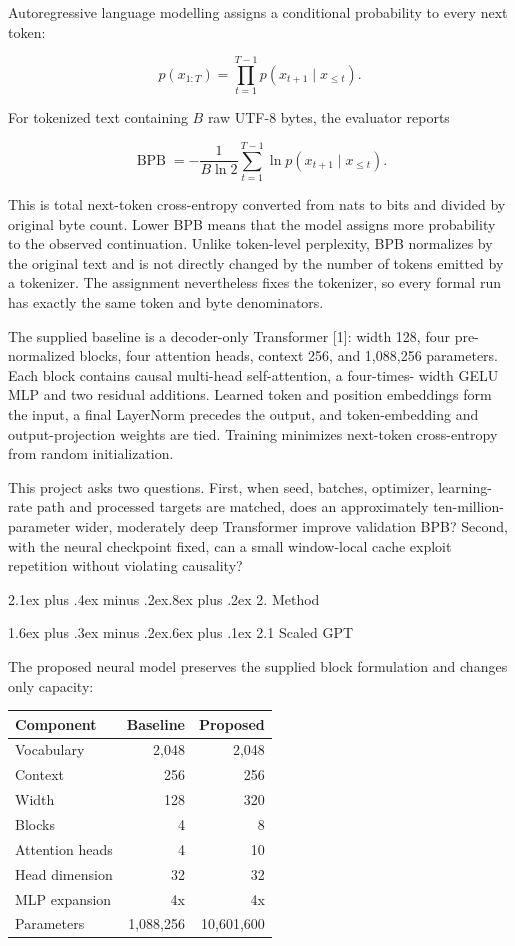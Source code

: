 \documentclass[11pt]{article}
\makeatletter
\renewcommand\section{\@startsection{section}{1}{0pt}%
  {2.1ex plus .4ex minus .2ex}{.8ex plus .2ex}%
  {\normalfont\large\bfseries}}
\renewcommand\subsection{\@startsection{subsection}{2}{0pt}%
  {1.6ex plus .3ex minus .2ex}{.6ex plus .1ex}%
  {\normalfont\normalsize\bfseries}}
\makeatother
\begin{document}
Autoregressive language modelling assigns a conditional probability to
every next token:

\[
p(x_{1:T})=\prod_{t=1}^{T-1}p(x_{t+1}\mid x_{\leq t}).
\]

For tokenized text containing \(B\) raw UTF-8 bytes, the evaluator
reports

\[
\operatorname{BPB}=
-\frac{1}{B\ln 2}\sum_{t=1}^{T-1}\ln p(x_{t+1}\mid x_{\leq t}).
\]

This is total next-token cross-entropy converted from nats to bits and
divided by original byte count. Lower BPB means that the model assigns
more probability to the observed continuation. Unlike token-level
perplexity, BPB normalizes by the original text and is not directly
changed by the number of tokens emitted by a tokenizer. The assignment
nevertheless fixes the tokenizer, so every formal run has exactly the
same token and byte denominators.

The supplied baseline is a decoder-only Transformer {[}1{]}: width 128,
four pre-normalized blocks, four attention heads, context 256, and
1,088,256 parameters. Each block contains causal multi-head
self-attention, a four-times- width GELU MLP and two residual additions.
Learned token and position embeddings form the input, a final LayerNorm
precedes the output, and token-embedding and output-projection weights
are tied. Training minimizes next-token cross-entropy from random
initialization.

This project asks two questions. First, when seed, batches, optimizer,
learning-rate path and processed targets are matched, does an
approximately ten-million-parameter wider, moderately deep Transformer
improve validation BPB? Second, with the neural checkpoint fixed, can a
small window-local cache exploit repetition without violating causality?

\section{2. Method}\label{2-method}

\subsection{2.1 Scaled GPT}\label{21-scaled-gpt}

The proposed neural model preserves the supplied block formulation and
changes only capacity:

\begin{longtable}[]{@{}lrr@{}}
\toprule\noalign{}
Component & Baseline & Proposed \\
\midrule\noalign{}
\endhead
\bottomrule\noalign{}
\endlastfoot
Vocabulary & 2,048 & 2,048 \\
Context & 256 & 256 \\
Width & 128 & 320 \\
Blocks & 4 & 8 \\
Attention heads & 4 & 10 \\
Head dimension & 32 & 32 \\
MLP expansion & 4x & 4x \\
Parameters & 1,088,256 & 10,601,600 \\
\end{longtable}
\end{document}
